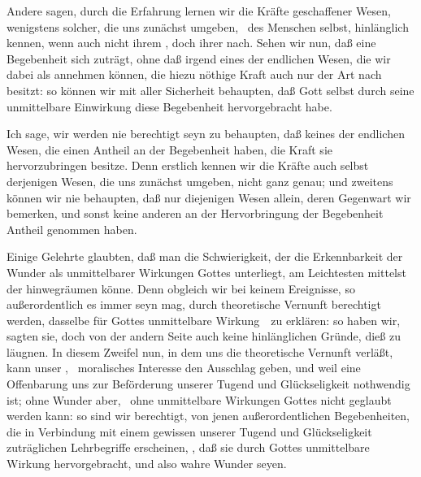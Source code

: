 \begin{aufzb}\setcounter{enumi}{1}
\item Andere sagen, durch die Erfahrung lernen wir die Kräfte  geschaffener Wesen, wenigstens solcher, die uns zunächst umgeben, \zB\ des Menschen selbst, hinlänglich kennen, wenn auch nicht ihrem , doch ihrer  nach. Sehen wir nun, daß eine Begebenheit sich zuträgt, ohne daß irgend eines der endlichen Wesen, die wir dabei als  annehmen können, die hiezu nöthige Kraft auch nur der Art nach besitzt: so können wir mit aller Sicherheit behaupten, daß Gott selbst durch seine unmittelbare Einwirkung diese Begebenheit hervorgebracht habe.
\end{aufzb}\par
   Ich sage, wir werden nie berechtigt seyn zu behaupten, daß keines der endlichen Wesen, die einen Antheil an der Begebenheit haben, die Kraft sie hervorzubringen besitze. Denn erstlich kennen wir die Kräfte auch selbst derjenigen Wesen, die uns zunächst umgeben, nicht ganz genau; und zweitens können wir nie behaupten, daß nur diejenigen Wesen allein, deren Gegenwart wir bemerken, und sonst keine anderen an der Hervorbringung der Begebenheit Antheil genommen haben.
\begin{aufza}\setcounter{enumi}{4}
\item Einige Gelehrte glaubten, daß man die Schwierigkeit, der die Erkennbarkeit der Wunder als unmittelbarer Wirkungen Gottes unterliegt, am Leichtesten mittelst der  hinwegräumen könne. Denn obgleich wir bei keinem Ereignisse, so außerordentlich es immer seyn mag, durch theoretische Vernunft berechtigt werden, dasselbe für Gottes unmittelbare Wirkung~\ zu erklären: so haben wir, sagten sie, doch von der andern Seite auch keine hinlänglichen Gründe, dieß zu läugnen. In diesem Zweifel nun, in dem uns die theoretische Vernunft verläßt, kann unser , \dh\ moralisches Interesse den Ausschlag geben, und weil eine Offenbarung uns zur Beförderung unserer Tugend und Glückseligkeit nothwendig ist; ohne Wunder aber, \dh\ ohne unmittelbare Wirkungen Gottes nicht geglaubt werden kann: so sind wir berechtigt, von jenen außerordentlichen Begebenheiten, die in Verbindung mit einem gewissen unserer Tugend und Glückseligkeit zuträglichen Lehrbegriffe erscheinen, , daß sie durch Gottes unmittelbare Wirkung hervorgebracht, und also wahre Wunder seyen.
\end{aufza}\par
